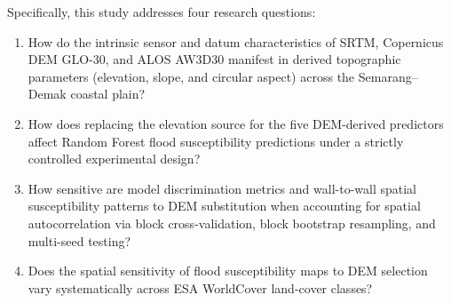 \documentclass[11pt,twoside]{article}
\begin{document}
Specifically, this study addresses four research questions:
\begin{enumerate}
\item How do the intrinsic sensor and datum characteristics of SRTM, Copernicus DEM GLO-30, and ALOS AW3D30 manifest in derived topographic parameters (elevation, slope, and circular aspect) across the Semarang--Demak coastal plain?
\item How does replacing the elevation source for the five DEM-derived predictors affect Random Forest flood susceptibility predictions under a strictly controlled experimental design?
\item How sensitive are model discrimination metrics and wall-to-wall spatial susceptibility patterns to DEM substitution when accounting for spatial autocorrelation via block cross-validation, block bootstrap resampling, and multi-seed testing?
\item Does the spatial sensitivity of flood susceptibility maps to DEM selection vary systematically across ESA WorldCover land-cover classes?
\end{enumerate}
\end{document}
